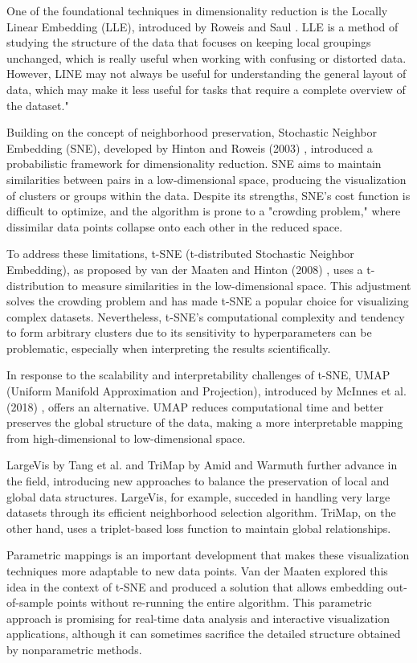 One of the foundational techniques in dimensionality reduction is the Locally Linear Embedding (LLE), introduced by Roweis and Saul \cite{roweis2000nonlinear}. LLE is a method of studying the structure of the data that focuses on keeping local groupings unchanged, which is really useful when working with confusing or distorted data. However, LINE may not always be useful for understanding the general layout of data, which may make it less useful for tasks that require a complete overview of the dataset."

Building on the concept of neighborhood preservation, Stochastic Neighbor Embedding (SNE), developed by Hinton and Roweis (2003) \cite{hinton2002stochastic}, introduced a probabilistic framework for dimensionality reduction. SNE aims to maintain similarities between pairs in a low-dimensional space, producing the visualization of clusters or groups within the data. Despite its strengths, SNE's cost function is difficult to optimize, and the algorithm is prone to a "crowding problem," where dissimilar data points collapse onto each other in the reduced space.

To address these limitations, t-SNE (t-distributed Stochastic Neighbor Embedding), as proposed by van der Maaten and Hinton (2008) \cite {van2008visualizing}, uses a t-distribution to measure similarities in the low-dimensional space. This adjustment solves the crowding problem and has made t-SNE a popular choice for visualizing complex datasets. Nevertheless, t-SNE's computational complexity and tendency to form arbitrary clusters due to its sensitivity to hyperparameters can be problematic, especially when interpreting the results scientifically.

In response to the scalability and interpretability challenges of t-SNE, UMAP (Uniform Manifold Approximation and Projection), introduced by McInnes et al. (2018) \cite{mcinnes2018umap}, offers an alternative. UMAP reduces computational time and better preserves the global structure of the data, making a more interpretable mapping from high-dimensional to low-dimensional space.

LargeVis by Tang et al. \cite{tang2016visualizing} and TriMap by Amid and Warmuth \cite {amid2019trimap} further advance in the field, introducing new approaches to balance the preservation of local and global data structures. LargeVis, for example, succeded in handling very large datasets through its efficient neighborhood selection algorithm. TriMap, on the other hand, uses a triplet-based loss function to maintain global relationships.

Parametric mappings is an important development that makes these visualization techniques more adaptable to new data points. Van der Maaten explored this idea \cite{van2009learning} in the context of t-SNE and produced a solution that allows embedding out-of-sample points without re-running the entire algorithm. This parametric approach is promising for real-time data analysis and interactive visualization applications, although it can sometimes sacrifice the detailed structure obtained by nonparametric methods.